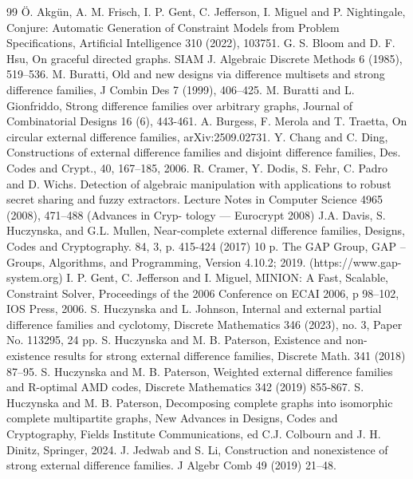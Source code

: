 \documentclass[12pt, a4paper]{article}
\theoremstyle{definition}
\begin{document}
\begin{thebibliography}{99}
 Ö. Akgün, A. M. Frisch, I. P. Gent, C. Jefferson, I. Miguel and P. Nightingale, Conjure: Automatic Generation of Constraint Models from Problem Specifications, Artificial Intelligence 310 (2022), 103751.
 G. S. Bloom and D. F. Hsu, On graceful directed graphs. SIAM J. Algebraic Discrete Methods 6 (1985), 519–536.
 M. Buratti, Old and new designs via difference multisets and strong difference families, J Combin
Des 7 (1999), 406–425.
 M. Buratti and L. Gionfriddo, Strong difference families over arbitrary graphs, Journal of Combinatorial Designs 16 (6), 443-461.
 A. Burgess, F. Merola and T. Traetta, On circular external difference families, arXiv:2509.02731.
  Y. Chang and C. Ding, Constructions of external difference families and disjoint difference families, Des. Codes and Crypt., 40, 167–185, 2006.
  R. Cramer, Y. Dodis, S. Fehr, C. Padro and D. Wichs. Detection of algebraic
manipulation with applications to robust secret sharing and fuzzy extractors.
Lecture Notes in Computer Science 4965 (2008), 471–488 (Advances in Cryp-
tology — Eurocrypt 2008)
 J.A. Davis, S. Huczynska, and G.L. Mullen, Near-complete external difference families, Designs, Codes and Cryptography. 84, 3, p. 415-424 (2017) 10 p. 
  The GAP Group, GAP – Groups, Algorithms, and Programming, Version 4.10.2; 2019.
(https://www.gap-system.org)
 I. P. Gent, C. Jefferson and I. Miguel, MINION: A Fast, Scalable, Constraint Solver, Proceedings of the 2006 Conference on ECAI 2006, p 98–102, IOS Press, 2006.
 S. Huczynska and L. Johnson, Internal and external partial difference families and cyclotomy,  Discrete Mathematics 346 (2023), no. 3, Paper No. 113295, 24 pp. 
  S. Huczynska and M. B. Paterson, Existence and non-existence results for strong external difference families,
Discrete Math. 341 (2018) 87–95.
 S. Huczynska and M. B. Paterson, Weighted external difference families and R-optimal AMD codes, Discrete Mathematics 342 (2019) 855-867. 
 S. Huczynska and M. B. Paterson, Decomposing complete graphs into isomorphic complete multipartite graphs, New Advances in Designs, Codes and Cryptography, Fields Institute Communications, ed C.J. Colbourn and J. H. Dinitz, Springer, 2024. 
 J. Jedwab and S. Li, Construction and nonexistence of strong external difference families. J Algebr Comb 49 (2019) 21–48. 

\end{thebibliography}
\end{document}
